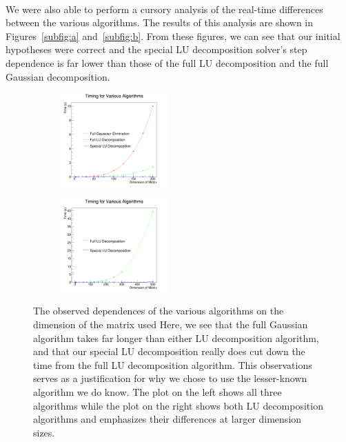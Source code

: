 \documentclass[12pt]{article}
\numberwithin{equation}{section}
\begin{document}
\\\indent We were also able to perform a cursory analysis of the real-time differences between the various algorithms.  The results of this analysis are shown in Figures~\ref{subfig:a} and~\ref{subfig:b}.  From these figures, we can see that our initial hypotheses were correct and the special LU decomposition solver's step dependence is far lower than those of the full LU decomposition and the full Gaussian decomposition.

\begin{figure}[h]
\begin{center}
\begin{subfigure}
\label{subfig:a}
\includegraphics[width=0.45\textwidth]{plots/time_plot}
\end{subfigure}
\begin{subfigure}
\label{subfig:b}
\includegraphics[width=0.45\textwidth]{plots/time_plot_short}
\end{subfigure}
\caption{The observed dependences of the various algorithms on the dimension of the matrix used  Here, we see that the full Gaussian algorithm takes far longer than either LU decomposition algorithm, and that our special LU decomposition really does cut down the time from the full LU decomposition algorithm.  This observations serves as a justification for why we chose to use the lesser-known algorithm we do know.  The plot on the left shows all three algorithms while the plot on the right shows both LU decomposition algorithms and emphasizes their differences at larger dimension sizes.}
\end{center}
\end{figure}
\end{document}

